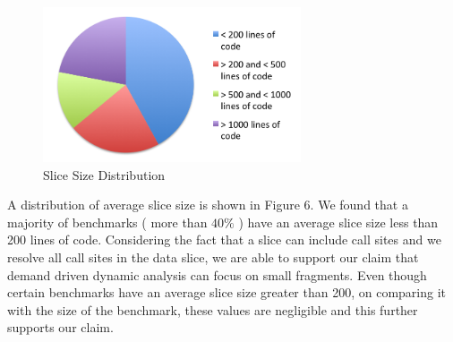 \documentclass[12pt]{article}
\begin{document}
\begin{figure}[H]
     \centering
     \includegraphics[width=3in]{slice-size-distribution.png}
     \caption{Slice Size Distribution}
     \label{slice size distribution}
 \end{figure}
 
 
A distribution of average slice size is shown in Figure 6. We found that a majority of benchmarks ( more than $40\%$ ) have an average slice size less than 200 lines of code. Considering the fact that a slice can include call sites and we resolve all call sites in the data slice, we are able to support our claim that demand driven dynamic analysis can focus on small fragments. Even though certain benchmarks have an average slice size greater than 200, on comparing it with the size of the benchmark, these values are negligible and this further supports our claim.  \\
\end{document}
